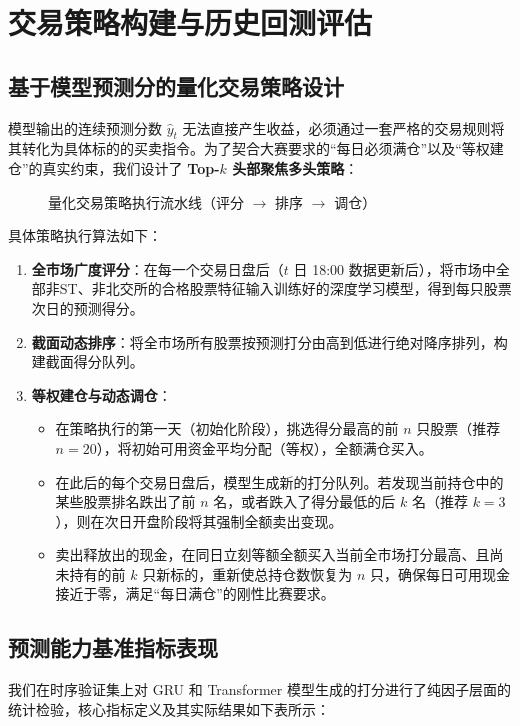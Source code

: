 \documentclass[9pt,a4paper,twoside]{rho-class/rho}
\begin{document}
\section{交易策略构建与历史回测评估}

    \subsection{基于模型预测分的量化交易策略设计}
    模型输出的连续预测分数 $\hat{y}_t$ 无法直接产生收益，必须通过一套严格的交易规则将其转化为具体标的的买卖指令。为了契合大赛要求的“每日必须满仓”以及“等权建仓”的真实约束，我们设计了 \textbf{Top-$k$ 头部聚焦多头策略}：
    
    \begin{figure}[H]
        \centering
        \caption{量化交易策略执行流水线（评分 $\rightarrow$ 排序 $\rightarrow$ 调仓）}
    \end{figure}

    具体策略执行算法如下：
    \begin{enumerate}
        \item \textbf{全市场广度评分}：在每一个交易日盘后（$t$ 日 18:00 数据更新后），将市场中全部非ST、非北交所的合格股票特征输入训练好的深度学习模型，得到每只股票次日的预测得分。
        \item \textbf{截面动态排序}：将全市场所有股票按预测打分由高到低进行绝对降序排列，构建截面得分队列。
        \item \textbf{等权建仓与动态调仓}：
        \begin{itemize}
            \item 在策略执行的第一天（初始化阶段），挑选得分最高的前 $n$ 只股票（推荐 $n=20$），将初始可用资金平均分配（等权），全额满仓买入。
            \item 在此后的每个交易日盘后，模型生成新的打分队列。若发现当前持仓中的某些股票排名跌出了前 $n$ 名，或者跌入了得分最低的后 $k$ 名（推荐 $k=3$），则在次日开盘阶段将其强制全额卖出变现。
            \item 卖出释放出的现金，在同日立刻等额全额买入当前全市场打分最高、且尚未持有的前 $k$ 只新标的，重新使总持仓数恢复为 $n$ 只，确保每日可用现金接近于零，满足“每日满仓”的刚性比赛要求。
        \end{itemize}
    \end{enumerate}

    \subsection{预测能力基准指标表现}
    我们在时序验证集上对 GRU 和 Transformer 模型生成的打分进行了纯因子层面的统计检验，核心指标定义及其实际结果如下表所示：
\end{document}
